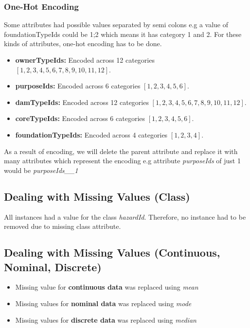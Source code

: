 \documentclass{article}
\begin{document}
\subsubsection{One-Hot Encoding}

Some attributes had possible values separated by semi colons e.g a value of foundationTypeIds could be 1;2 which means it has category 1 and 2. For these kinds of attributes, one-hot encoding has to be done. 

\begin{itemize}
    \item \textbf{ownerTypeIds:} Encoded across 12 categories \([1, 2, 3, 4, 5, 6, 7, 8, 9, 10, 11, 12]\).
    \item \textbf{purposeIds:} Encoded across 6 categories \([1, 2, 3, 4, 5, 6]\).
    \item \textbf{damTypeIds:} Encoded across 12 categories \([1, 2, 3, 4, 5, 6, 7, 8, 9, 10, 11, 12]\).
    \item \textbf{coreTypeIds:} Encoded across 6 categories \([1, 2, 3, 4, 5, 6]\).
    \item \textbf{foundationTypeIds:} Encoded across 4 categories \([1, 2, 3, 4]\).
\end{itemize}

As a result of encoding, we will delete the parent attribute and replace it with many attributes which represent the encoding e.g attribute \textit{purposeIds} of just 1 would be \textit{purposeIds\_\_1}

\subsection{Dealing with Missing Values (Class)}
All instances had a value for the class \textit{hazardId}. Therefore, no instance had to be removed due to missing class attribute.

\subsection{Dealing with Missing Values (Continuous, Nominal, Discrete)}
\begin{itemize}
    \item Missing value for \textbf{continuous data} was replaced using \textit{mean}
    \item Missing values for \textbf{nominal data} was replaced using \textit{mode}
    \item Missing values for \textbf{discrete data} was replaced using \textit{median}
\end{itemize}
\end{document}

